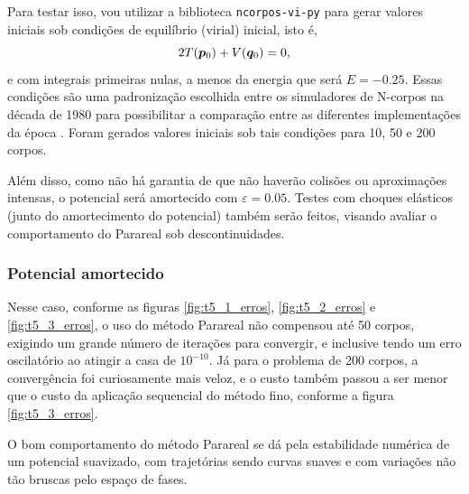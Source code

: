Para testar isso, vou utilizar a biblioteca \texttt{ncorpos-vi-py} \cite{ncorpos_vi_py} para gerar valores iniciais sob condições de equilíbrio (virial) inicial, isto é,
\begin{equation}
2 T (\bm p_0) + V(\bm q_0) = 0,
\end{equation}
e com integrais primeiras nulas, a menos da energia que será $E=-0.25$. Essas condições são uma padronização escolhida entre os simuladores de N-corpos na década de 1980 para possibilitar a comparação entre as diferentes implementações da época \cites{Heggie}[pp.110-112]{aarseth_gravitational_2003}. Foram gerados valores iniciais sob tais condições para 10, 50 e 200 corpos.

Além disso, como não há garantia de que não haverão colisões ou aproximações intensas, o potencial será amortecido com $\varepsilon = 0.05$. Testes com choques elásticos (junto do amortecimento do potencial) também serão feitos, visando avaliar o comportamento do Parareal sob descontinuidades. 


\subsubsection{Potencial amortecido}

Nesse caso, conforme as figuras \ref{fig:t5_1_erros}, \ref{fig:t5_2_erros} e \ref{fig:t5_3_erros}, o uso do método Parareal não compensou até 50 corpos, exigindo um grande número de iterações para convergir, e inclusive tendo um erro oscilatório ao atingir a casa de $10^{-10}$. Já para o problema de 200 corpos, a convergência foi curiosamente mais veloz, e o custo também passou a ser menor que o custo da aplicação sequencial do método fino, conforme a figura \ref{fig:t5_3_erros}.

O bom comportamento do método Parareal se dá pela estabilidade numérica de um potencial suavizado, com trajetórias sendo curvas suaves e com variações não tão bruscas pelo espaço de fases.

